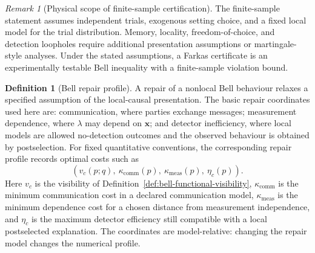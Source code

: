 \documentclass[11pt]{article}
\theoremstyle{plain}
\theoremstyle{definition}
\newtheorem{definition}[theorem]{Definition}
\theoremstyle{remark}
\newtheorem{remark}[theorem]{Remark}
\begin{document}
\begin{remark}[Physical scope of finite-sample certification]
The finite-sample statement assumes independent trials, exogenous setting choice,
and a fixed local model for the trial distribution. Memory, locality,
freedom-of-choice, and detection loopholes require additional presentation
assumptions or martingale-style analyses. Under the stated assumptions, a Farkas
certificate is an experimentally testable Bell inequality with a finite-sample
violation bound.
\end{remark}

\begin{definition}[Bell repair profile]
\label{def:bell-repair-profile}
A repair of a nonlocal Bell behaviour relaxes a specified assumption of the
local-causal presentation. The basic repair coordinates used here are:
communication, where parties exchange messages; measurement dependence, where
\(\lambda\) may depend on \(\mathbf x\); and detector inefficiency, where local
models are allowed no-detection outcomes and the observed behaviour is obtained
by postselection. For fixed quantitative conventions, the corresponding repair
profile records optimal costs such as
\[
(v_c(p;q),\ \kappa_{\mathrm{comm}}(p),\ \kappa_{\mathrm{meas}}(p),\ \eta_c(p)).
\]
Here \(v_c\) is the visibility of Definition~\ref{def:bell-functional-visibility},
\(\kappa_{\mathrm{comm}}\) is the minimum communication cost in a declared
communication model, \(\kappa_{\mathrm{meas}}\) is the minimum dependence cost for
a chosen distance from measurement independence, and \(\eta_c\) is the maximum
detector efficiency still compatible with a local postselected explanation. The
coordinates are model-relative: changing the repair model changes the numerical
profile.
\end{definition}
\end{document}
